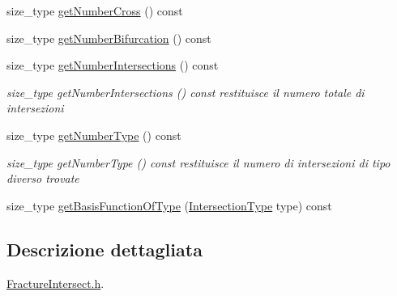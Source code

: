 \begin{DoxyCompactItemize}
size\-\_\-type \hyperlink{classFractureIntersect_a8d9f707319b9b83744b6e03f19003734}{get\-Number\-Cross} () const 
\item 
size\-\_\-type \hyperlink{classFractureIntersect_afba7c92096a4b92a27fcb4f1158c7279}{get\-Number\-Bifurcation} () const 
\item 
size\-\_\-type \hyperlink{classFractureIntersect_aaff97a1338251e796ce44db631961459}{get\-Number\-Intersections} () const 
\begin{DoxyCompactList}\small\item\em size\-\_\-type get\-Number\-Intersections () const restituisce il numero totale di intersezioni \end{DoxyCompactList}\item 
size\-\_\-type \hyperlink{classFractureIntersect_a86195f7e54a79412d2d54fa5efad9af2}{get\-Number\-Type} () const 
\begin{DoxyCompactList}\small\item\em size\-\_\-type get\-Number\-Type () const restituisce il numero di intersezioni di tipo diverso trovate \end{DoxyCompactList}\item 
size\-\_\-type \hyperlink{classFractureIntersect_a8293ef859c572a375c7c5f6e79399b1e}{get\-Basis\-Function\-Of\-Type} (\hyperlink{classFractureIntersect_a9a4e4a784fa4c8e359767ed543f89dc5}{Intersection\-Type} type) const 
\end{DoxyCompactItemize}


\subsection{Descrizione dettagliata}
\hyperlink{FractureIntersect_8h}{Fracture\-Intersect.\-h}. 



